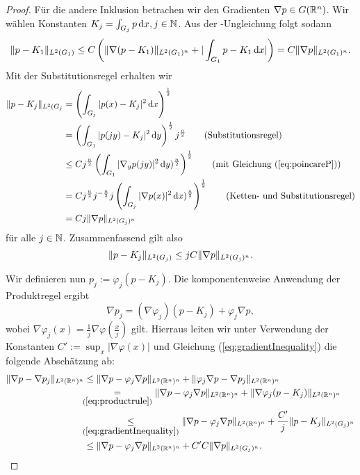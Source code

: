\begin{proof}
  Für die andere Inklusion betrachen wir den Gradienten $\nabla p \in G(\mathbb{R}^n)$.
  Wir wählen Konstanten $K_j = \int_{G_j} p \, {\operatorname{d}\!{x}}, j \in \mathbb{N}$.
  Aus der \poincare\hyp{}Ungleichung \cite[S.44, Lemma 1.1.2]{sohr2001navier} folgt sodann
  \begin{equation}
    \label{eq:poincareP}
  \lVert p - K_1 \rVert_{L^2(G_1)} \leq C \left(\lVert \nabla (p - K_1) \rVert_{L^2(G_1)^n} + | \int_{G_1} p - K_1 \, {\operatorname{d}\!{x}} |\right) =  C \lVert \nabla p \rVert_{L^2(G_1)^n}.
\end{equation}
  Mit der Substitutionsregel erhalten wir
\begin{align*}
  \norm{p - K_j}_{L^2(G_j} 
  &= \left( \int_{G_j} |p(x) - K_j|^2 \d x \right)^\frac{1}{2} \\
  &= \left( \int_{G_1} |p(jy) - K_j|^2 \d y \right)^\frac{1}{2} j^\frac{n}{2} \tag{Substitutionsregel}\\
  &\leq C j^{\frac{n}{2}}\left( \int_{G_1} |\nabla_y p(jy) |^2 \d y )^{\frac{n}{2}} \right)^{\frac{1}{2}} \tag{mit Gleichung (\ref{eq:poincareP})}\\
  &= C j^{\frac{n}{2}}j^{-\frac{n}{2}}j \left( \int_{G_j} |\nabla p(x) |^2 \d x )^{\frac{n}{2}} \right)^{\frac{1}{2}} \tag{Ketten- und Substitutionsregel} \\
  &= C j \norm{\nabla p}_{L^2(G_j)^n}
\end{align*}
  für alle $j \in \mathbb{N}$.
  Zusammenfassend gilt also
  \begin{equation}
    \label{eq:gradientInequality}
    \lVert p - K_j \rVert_{L^2(G_j)} \leq j C\lVert \nabla p \rVert_{L^2(G_j)^n}.
  \end{equation}

  Wir definieren nun $p_j := \varphi_j (p - K_j)$.
  Die komponentenweise Anwendung der Produktregel ergibt 
  \begin{equation}
    \label{eq:productrule}
    \nabla p_j =  (\nabla \varphi_j)(p - K_j) + \varphi_j \nabla p,
  \end{equation}
  wobei $\nabla \varphi_j(x) = \frac{1}{j} \nabla \varphi (\frac{x}{j})$ gilt.
  Hierraus leiten wir unter Verwendung der Konstanten $C' := \sup_x |\nabla \varphi(x)|$ und Gleichung (\ref{eq:gradientInequality}) die folgende Abschätzung ab:
  \begin{align}
    \norm{\nabla p - \nabla p_j}_{L^2(\R^n)^n}
    &\leq \norm{\nabla p - \varphi_j \nabla p}_{L^2(\R^n)^n} + \norm{\varphi_j \nabla p - \nabla p_j}_{L^2(\R^n)^n} \nonumber\\
    &\hspace{-0.15cm}\underset{(\ref{eq:productrule})}{=} \norm{\nabla p - \varphi_j \nabla p}_{L^2(\R^n)^n}    + \norm{\nabla\varphi_j (p - K_j)}_{L^2(\R^n)^n} \nonumber\\
    &\hspace{-0.15cm}\underset{(\ref{eq:gradientInequality})} \leq \norm{\nabla p - \varphi_j \nabla p}_{L^2(\R^n)^n} + \frac{C'}{j} \norm{p - K_j}_{L^2(G_j)^n}\nonumber\\
    &\leq \norm{\nabla p - \varphi_j \nabla p}_{L^2(\R^n)^n} + C'C \norm{\nabla p}_{L^2(G_j)^n} \label{eq:gradDiff}.
  \end{align}


\end{proof}
